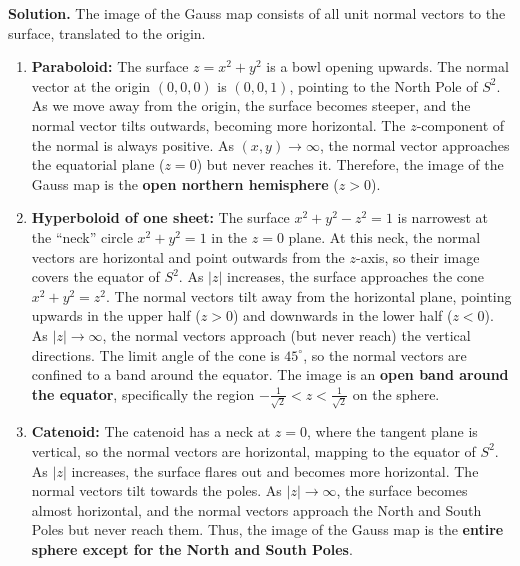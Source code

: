 \documentclass[12pt, a4paper, oneside]{article}
\newenvironment{solution}
  {\par\noindent\textbf{Solution. }\newline}
  {\par}
\begin{document}
\begin{solution}
The image of the Gauss map consists of all unit normal vectors to the surface, translated to the origin.
\begin{enumerate}
\item \textbf{Paraboloid:} The surface $z=x^2+y^2$ is a bowl opening upwards. The normal vector at the origin $(0,0,0)$ is $(0,0,1)$, pointing to the North Pole of $S^2$. As we move away from the origin, the surface becomes steeper, and the normal vector tilts outwards, becoming more horizontal. The $z$-component of the normal is always positive. As $(x,y) \to \infty$, the normal vector approaches the equatorial plane ($z=0$) but never reaches it. Therefore, the image of the Gauss map is the \textbf{open northern hemisphere} ($z>0$).

\item \textbf{Hyperboloid of one sheet:} The surface $x^2+y^2-z^2=1$ is narrowest at the ``neck'' circle $x^2+y^2=1$ in the $z=0$ plane. At this neck, the normal vectors are horizontal and point outwards from the $z$-axis, so their image covers the equator of $S^2$. As $|z|$ increases, the surface approaches the cone $x^2+y^2=z^2$. The normal vectors tilt away from the horizontal plane, pointing upwards in the upper half ($z>0$) and downwards in the lower half ($z<0$). As $|z| \to \infty$, the normal vectors approach (but never reach) the vertical directions. The limit angle of the cone is $45^\circ$, so the normal vectors are confined to a band around the equator. The image is an \textbf{open band around the equator}, specifically the region $-\frac{1}{\sqrt{2}} < z < \frac{1}{\sqrt{2}}$ on the sphere.

\item \textbf{Catenoid:} The catenoid has a neck at $z=0$, where the tangent plane is vertical, so the normal vectors are horizontal, mapping to the equator of $S^2$. As $|z|$ increases, the surface flares out and becomes more horizontal. The normal vectors tilt towards the poles. As $|z| \to \infty$, the surface becomes almost horizontal, and the normal vectors approach the North and South Poles but never reach them. Thus, the image of the Gauss map is the \textbf{entire sphere except for the North and South Poles}.
\end{enumerate}
\end{solution}
\end{document}
